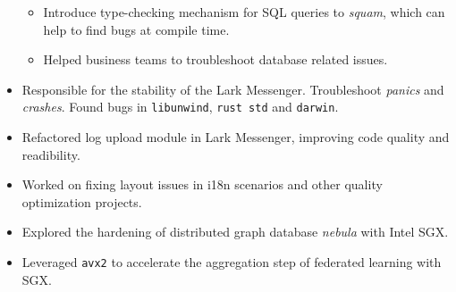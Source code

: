 \documentclass{resume}
\newcommand{\en}[1]{#1}
\newcommand{\zh}[1]{}
\begin{document}
\begin{itemize}
\begin{itemize}
{                        }
                  \item \en{
                            Introduce type-checking mechanism for SQL queries to \textit{squam}, which can help to find bugs at compile time.
                        }
                        \zh{
                            为 \textit{squam} 引入了 SQL 查询的类型检查机制，可以在编译时发现大部分 bug。
                        }
                  \item \en{
                            Helped business teams to troubleshoot database related issues.
                        }
                        \zh{
                            协助业务方排查数据库相关的问题。
                        }
            \end{itemize}
      \item \en{
                Responsible for the stability of the Lark Messenger. Troubleshoot \textit{panics} and \textit{crashes}.
                Found bugs in \texttt{libunwind}, \texttt{rust std} and \texttt{darwin}.
            }
            \zh{
                负责飞书客户端的稳定性，定位并修复 \textit{panic} 和 \textit{crash}。
                在定位过程中发现了 \texttt{libunwind}、\texttt{rust std} 和 \texttt{darwin} 等基础库的一些 bug。
            }
      \item \en{
                Refactored log upload module in Lark Messenger, improving code quality and readibility.
            }
            \zh{
                重构了飞书的日志上传模块，提升了代码质量和可读性。
            }
\end{itemize}

\en{}
\zh{\datedsubsection{\textbf{\href{https://www.bytedance.com/}{字节跳动}}}{04/2020 -- 07/2020}}
\en{}
\zh{\role{飞书}{iOS 研发实习}}
\begin{itemize}
      \item \en{Worked on fixing layout issues in i18n scenarios and other quality optimization projects.}
            \zh{主要任务为国际化场景下 iOS 端的布局问题的修复等品质优化相关项目。}
\end{itemize}

\en{}
\zh{\datedsubsection{\textbf{清华大学信息技术研究院}}{10/2019 -- 04/2020}}
\en{}
\zh{\role{网络安全实验室}{科研实习}}
\begin{itemize}
      \item \en{Explored the hardening of distributed graph database \textit{nebula} with Intel SGX.}
            \zh{探索使用 Intel SGX 技术对分布式图数据库 \textit{nebula} 进行加固。}
      \item \en{Leveraged \texttt{avx2} to accelerate the aggregation step of federated learning with SGX.}
            \zh{利用 \texttt{avx2} 指令集加速了 SGX 技术下联邦学习的模型聚合。}
\end{itemize}
\end{document}
